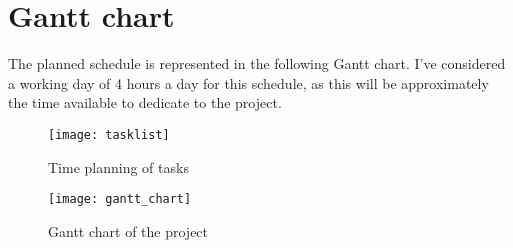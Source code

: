 \section{Gantt chart}

The planned schedule is represented in the following Gantt chart. I've considered 
a working day of 4 hours a day for this schedule, as this will be approximately the 
time available to dedicate to the project.

\begin{figure}[H]
    \centering
    \texttt{[image: tasklist]}
    \caption{Time planning of tasks}
    \label{fig:time_planning}
\end{figure}
\begin{figure}[H]
    \centering
    \texttt{[image: gantt\_chart]}
    \caption{Gantt chart of the project}
    \label{fig:gantt_chart}
\end{figure}


